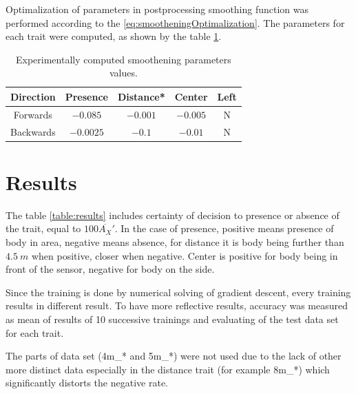 Optimalization of parameters in postprocessing smoothing function was performed
according to the \ref{eq:smootheningOptimalization}. The parameters for each trait
were computed, as shown by the table \ref{table:smootheningParameters}.

\begin{table}[!ht]
\begin{center}
\begin{tabular}{|c|c c c c|} \hline
\textbf{Direction}  & \textbf{Presence} & \textbf{Distance}*& \textbf{Center} & \textbf{Left} \\ \hline
Forwards            & $-0.085$          & $-0.001$          & $-0.005$        & N             \\
Backwards           & $-0.0025$         & $-0.1$            & $-0.01$         & N             \\ \hline
\end{tabular}
\caption{Experimentally computed smoothening parameters values.\label{table:smootheningParameters} }
\end{center}
\end{table}

\section{Results}

The table \ref{table:results} includes certainty of decision to presence or absence of the trait,
equal to $100\overline{A_{X}}'$. In the case of presence, positive means presence of body in area,
negative means absence, for distance it is body being further than $4.5~m$ when positive, closer when negative.
Center is positive for body being in front of the sensor, negative for body on the side.

Since the training is done by numerical solving of gradient descent, every training results in different
result. To have more reflective results, accuracy was measured as mean of results of 10 successive trainings
and evaluating of the test data set for each trait.

The parts of data set (4m\_* and 5m\_*) were not used due to the lack of other more distinct data especially in
the distance trait (for example 8m\_*) which significantly distorts the negative rate.

